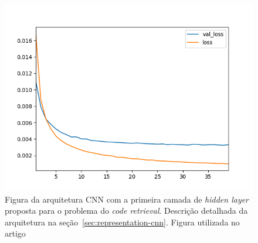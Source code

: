 \begin{figure}[h]
    \centering
    \includegraphics[width=1\textwidth]{figuras/cap-resultados-preliminares/569229_EmbeddingModel_plot.png}
    \caption{Figura da arquitetura CNN com a primeira camada de \textit{hidden layer} proposta para o problema do \textit{code retrieval}. Descrição detalhada da arquitetura na seção~\ref{sec:representation-cnn}. Figura utilizada no artigo \cite{marcelo-vem-2019}}
    \label{fig:arquitetura-cnn}
\end{figure}


